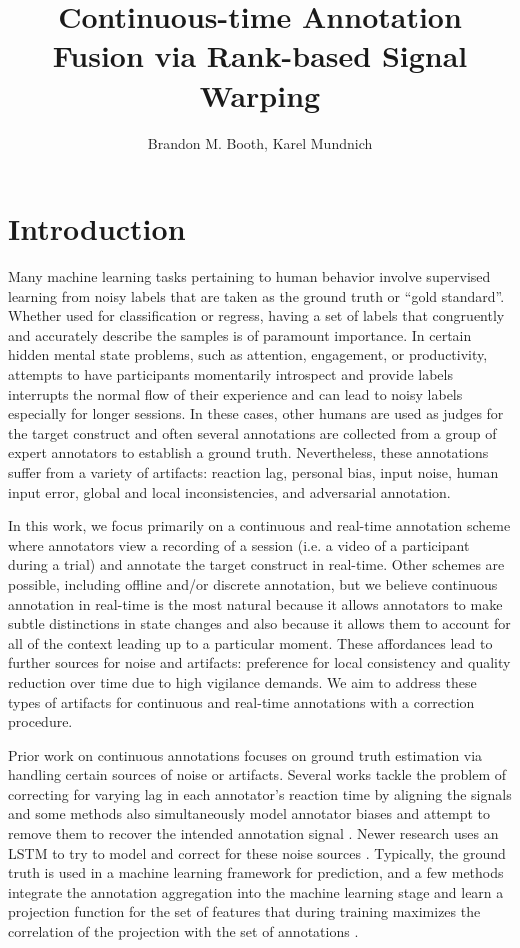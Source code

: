 \documentclass[]{article}
\title{Continuous-time Annotation Fusion via Rank-based Signal Warping}
\author{Brandon M. Booth, Karel Mundnich}
\begin{document}
\maketitle

\section{Introduction}
Many machine learning tasks pertaining to human behavior involve supervised learning from noisy labels that are taken as the ground truth or ``gold standard''. Whether used for classification or regress, having a set of labels that congruently and accurately describe the samples is of paramount importance. In certain hidden mental state problems, such as attention, engagement, or productivity, attempts to have participants momentarily introspect and provide labels interrupts the normal flow of their experience and can lead to noisy labels especially for longer sessions. In these cases, other humans are used as judges for the target construct and often several annotations are collected from a group of expert annotators to establish a ground truth.  Nevertheless, these annotations suffer from a variety of artifacts: reaction lag, personal bias, input noise, human input error, global and local inconsistencies, and adversarial annotation.

In this work, we focus primarily on a continuous and real-time annotation scheme where annotators view a recording of a session (i.e. a video of a participant during a trial) and annotate the target construct in real-time.  Other schemes are possible, including offline and/or discrete annotation, but we believe continuous annotation in real-time is the most natural because it allows annotators to make subtle distinctions in state changes and also because it allows them to account for all of the context leading up to a particular moment.  These affordances lead to further sources for noise and artifacts: preference for local consistency and quality reduction over time due to high vigilance demands.  We aim to address these types of artifacts for continuous and real-time annotations with a correction procedure.

Prior work on continuous annotations focuses on ground truth estimation via handling certain sources of noise or artifacts. Several works tackle the problem of correcting for varying lag in each annotator's reaction time by aligning the signals \cite{DTW2007, CTW2009, PCCA2005, Mariooryad2015} and some methods also simultaneously model annotator biases and attempt to remove them to recover the intended annotation signal \cite{nicolaou2014dynamic}.  Newer research uses an LSTM to try to model and correct for these noise sources \cite{TODO}. Typically, the ground truth is used in a machine learning framework for prediction, and a few methods integrate the annotation aggregation into the machine learning stage and learn a projection function for the set of features that during training maximizes the correlation of the projection with the set of annotations \cite{nicolaou2013correlated, CCA1936}. 
\end{document}
